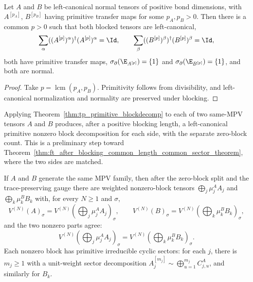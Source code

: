 \begin{theorem}%
    \label{thm:common_period_two_tensors}
    \leanok
    Let $A$ and $B$ be left-canonical normal tensors of positive bond dimensions,
    with $A^{[p_A]}$, $B^{[p_B]}$ having primitive transfer maps for some
    $p_A,p_B>0$. Then there is a common $p>0$ such that both blocked tensors are
    left-canonical,
    \[
        \sum_\alpha ((A^{[p]})^\alpha)^\dagger
        (A^{[p]})^\alpha = \Id,
        \qquad
        \sum_\beta ((B^{[p]})^\beta)^\dagger
        (B^{[p]})^\beta = \Id,
    \]
    both have primitive transfer maps,
    $\sigma_\partial(\E_{A^{[p]}})=\{1\}$ and
    $\sigma_\partial(\E_{B^{[p]}})=\{1\}$, and both are normal.
\end{theorem}

\begin{proof}\leanok
    Take $p = \operatorname{lcm}(p_A,p_B)$. Primitivity follows from
    divisibility, and left-canonical normalization and normality are preserved
    under blocking.
\end{proof}

\begin{remark}%
    \label{rem:ft_after_blocking_structural}
    Applying Theorem~\ref{thm:tp_primitive_blockdecomp} to each of two same-MPV
    tensors $A$ and $B$ produces, after a positive blocking length, a
    left-canonical primitive nonzero block decomposition for each side, with the
    separate zero-block count. This is a preliminary step toward
    Theorem~\ref{thm:ft_after_blocking_common_length_common_sector_theorem}, where
    the two sides are matched.
\end{remark}

\begin{theorem}%
    \label{thm:ft_after_blocking_per_block_cyclic_live_zero_tail}
    \leanok
    If $A$ and $B$ generate the same MPV family, then after the zero-block split
    and the trace-preserving gauge there are weighted nonzero-block tensors
    $\bigoplus_j \mu^A_j A_j$ and $\bigoplus_k \mu^B_k B_k$ with, for every
    $N\ge 1$ and $\sigma$,
    \[
        V^{(N)}(A)_\sigma
        =
        V^{(N)}\!(\textstyle\bigoplus_j \mu^A_j A_j)_\sigma,
        \qquad
        V^{(N)}(B)_\sigma
        =
        V^{(N)}\!(\textstyle\bigoplus_k \mu^B_k B_k)_\sigma,
    \]
    and the two nonzero parts agree:
    \[
        V^{(N)}\!(\textstyle\bigoplus_j \mu^A_j A_j)_\sigma
        =
        V^{(N)}\!(\textstyle\bigoplus_k \mu^B_k B_k)_\sigma.
    \]
    Each nonzero block has primitive irreducible cyclic sectors: for each $j$,
    there is $m_j\ge 1$ with a unit-weight sector decomposition
    $A_j^{[m_j]} \sim \bigoplus_{u=1}^{m_j} C^A_{j,u}$, and similarly for $B_k$.
\end{theorem}

